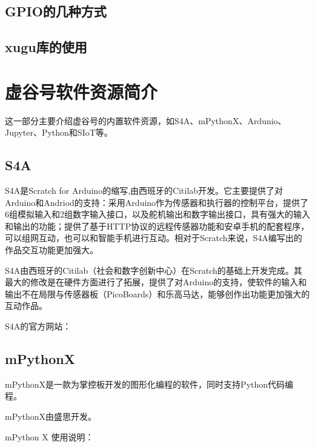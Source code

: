 \documentclass[letterpaper,10pt,english]{sphinxmanual}
\begin{document}
\section{GPIO的几种方式}
\label{\detokenize{04.gpio/4.1::doc}}\label{\detokenize{04.gpio/4.1:gpio}}

\section{xugu库的使用}
\label{\detokenize{04.gpio/4.2::doc}}\label{\detokenize{04.gpio/4.2:xugu}}

\chapter{虚谷号软件资源简介}
\label{\detokenize{05.soft/index::doc}}\label{\detokenize{05.soft/index:id1}}
这一部分主要介绍虚谷号的内置软件资源，如S4A、mPythonX、Ardunio、Jupyter、Python和SIoT等。


\section{S4A}
\label{\detokenize{05.soft/5.1-s4a::doc}}\label{\detokenize{05.soft/5.1-s4a:s4a}}
S4A是Scratch for Arduino的缩写,由西班牙的Citilab开发。它主要提供了对Arduino和Andriod的支持：采用Arduino作为传感器和执行器的控制平台，提供了6组模拟输入和2组数字输入接口，以及舵机输出和数字输出接口，具有强大的输入和输出的功能；提供了基于HTTP协议的远程传感器功能和安卓手机的配套程序，可以组网互动，也可以和智能手机进行互动。相对于Scratch来说，S4A编写出的作品交互功能更加强大。

S4A由西班牙的Citilab（社会和数字创新中心）在Scratch的基础上开发完成。其最大的修改是在硬件方面进行了拓展，提供了对Arduino的支持，使软件的输入和输出不在局限与传感器板（PicoBoards）和乐高马达，能够创作出功能更加强大的互动作品。

S4A的官方网站：


\section{mPythonX}
\label{\detokenize{05.soft/5.2-mPythonX::doc}}\label{\detokenize{05.soft/5.2-mPythonX:mpythonx}}
mPythonX是一款为掌控板开发的图形化编程的软件，同时支持Python代码编程。

mPythonX由盛思开发。

mPython X 使用说明：
\end{document}

